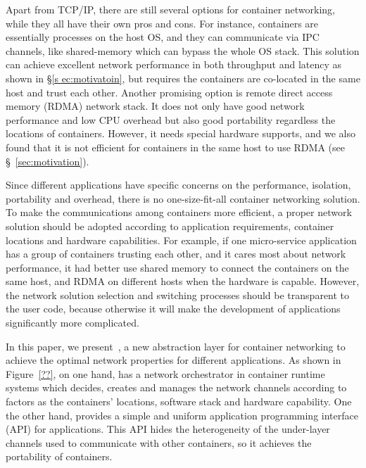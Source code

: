 Apart from TCP/IP, there are still several options for container networking,
while they all have their own pros and cons.
For instance, containers are essentially processes on the host OS, and they can 
communicate via IPC channels, like shared-memory which can bypass the whole OS 
stack. This solution can achieve
excellent network performance in both throughput and latency as shown in \S\ref{s
ec:motivatoin}, but requires the containers are co-located in the same host and 
trust each other. Another promising option is remote direct access memory (RDMA) network stack. It does not only have good network performance and low CPU overhead but also good portability regardless the locations of containers. 
However, it needs special hardware supports, and we also found that it is not efficient for containers in the same host to use RDMA
(see \S~\ref{sec:motivation}). 

Since different applications have specific concerns on the performance, 
isolation, portability and overhead, there is no
one-size-fit-all container networking solution. To make the communications among
containers more efficient, a proper network solution should be adopted according
to application requirements, container locations and hardware capabilities.
For example, if one micro-service application has a group of containers trusting each other, and it cares most about network performance, it had better use
shared memory to connect the containers on the same host, and RDMA on different hosts when the hardware is capable. However, the network solution selection and switching processes should be transparent to the user code, because otherwise it will make the development of applications significantly more complicated.

In this paper, we present~\sysname, a new abstraction layer for container networking to achieve the optimal network properties for different applications. 
As shown in Figure~\ref{??}, on one hand, \sysname has a network orchestrator in container runtime systems which decides, creates and manages the network channels according to factors as the containers' locations, software stack and hardware capability. One the other hand, \sysname provides a simple and uniform application programming interface (API) for applications. This API hides the heterogeneity of the under-layer channels used
to communicate with other containers, so it achieves the portability of containers.   

